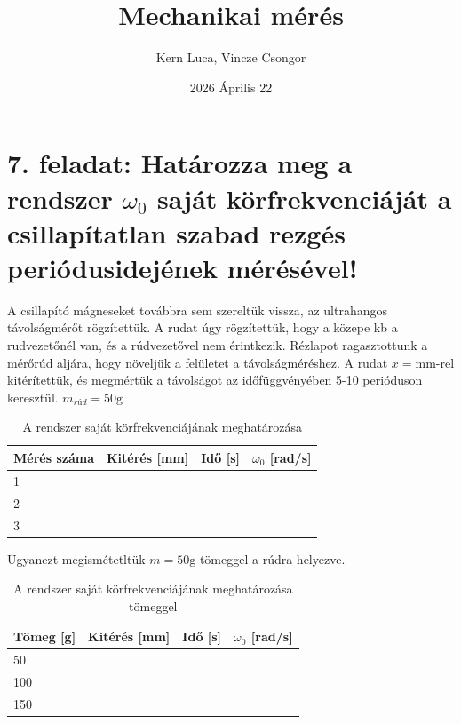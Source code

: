 \documentclass{article}
\title{Mechanikai mérés}
\author{Kern Luca, Vincze Csongor}
\date{2026 Április 22}
\begin{document}
\maketitle

\section*{7. feladat: Határozza meg a rendszer $\omega_0$ saját körfrekvenciáját a csillapítatlan szabad rezgés periódusidejének mérésével!}

A csillapító mágneseket továbbra sem szereltük vissza, az ultrahangos távolságmérőt rögzítettük. A rudat úgy rögzítettük, hogy a közepe kb a rudvezetőnél van, és a rúdvezetővel nem érintkezik. Rézlapot ragasztottunk a mérőrúd aljára, hogy növeljük a felületet a távolságméréshez.
A rudat $x = \text{mm}$-rel kitérítettük, és megmértük a távolságot az időfüggvényében 5-10 perióduson keresztül.
$m_{rúd} = 50 \text{g}$

\begin{table}[H]
    \centering
    \renewcommand{\arraystretch}{1.2}
    \begin{tabular}{|l|c|c|c|}
        \hline
        Mérés száma & Kitérés [mm] & Idő [s] & $\omega_0$ [rad/s] \\ \hline
        1 & & & \\ \hline
        2 & & & \\ \hline
        3 & & & \\ \hline
    \end{tabular}
    \caption{A rendszer saját körfrekvenciájának meghatározása}
    \label{tab:mecha_7}
\end{table}

Ugyanezt megismétetltük $m = 50\text{g}$ tömeggel a rúdra helyezve.

\begin{table}[H]
    \centering
    \renewcommand{\arraystretch}{1.2}
    \begin{tabular}{|l|c|c|c|}
        \hline
        Tömeg [g] & Kitérés [mm] & Idő [s] & $\omega_0$ [rad/s] \\ \hline
        50 & & & \\ \hline
        100 & & & \\ \hline
        150 & & & \\ \hline
    \end{tabular}
    \caption{A rendszer saját körfrekvenciájának meghatározása tömeggel}
    \label{tab:mecha_7_2}
\end{table}
\end{document}

